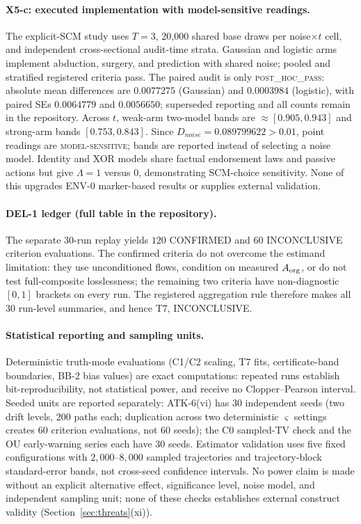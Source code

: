 \paragraph{X5-c: executed implementation with model-sensitive readings.}
The explicit-SCM study uses $T=3$, 20,000 shared base draws per noise$\times t$
cell, and independent cross-sectional audit-time strata. Gaussian and logistic
arms implement abduction, surgery, and prediction with shared noise; pooled and
stratified registered criteria pass. The paired audit is only
\textsc{post\_hoc\_pass}: absolute mean differences are $0.0077275$ (Gaussian)
and $0.0003984$ (logistic), with paired SEs $0.0064779$ and $0.0056650$;
superseded reporting and all counts remain in the repository.
Across $t$, weak-arm two-model bands are $\approx[0.905,0.943]$ and strong-arm
bands $[0.753,0.843]$. Since $D_{noise}=0.089799622>0.01$, point readings are
\textsc{model-sensitive}; bands are reported instead of selecting a noise model.
Identity and XOR models share factual endorsement laws and passive actions but
give $\Lambda=1$ versus $0$, demonstrating SCM-choice sensitivity. None of this
upgrades ENV-0 marker-based results or supplies external validation.

\paragraph{DEL-1 ledger (full table in the repository).}
The separate 30-run replay yields $120$ CONFIRMED and $60$ INCONCLUSIVE
criterion evaluations. The confirmed criteria do not overcome the estimand
limitation: they use unconditioned flows, condition on measured $A_{\mathrm{org}}$, or do
not test full-composite losslessness; the remaining two criteria have
non-diagnostic $[0,1]$ brackets on every run. The registered aggregation rule
therefore makes all 30 run-level summaries, and hence T7, INCONCLUSIVE.

\paragraph{Statistical reporting and sampling units.}
Deterministic truth-mode evaluations (C1/C2 scaling, T7 fits, certificate-band
boundaries, BB-2 bias values) are exact computations: repeated runs establish
bit-reproducibility, not statistical power, and receive no Clopper--Pearson
interval. Seeded units are reported separately: ATK-6(vi) has 30 independent
seeds (two drift levels, 200 paths each; duplication across two deterministic
$\varsigma$ settings creates 60 criterion evaluations, not 60 seeds); the C0
sampled-TV check and the OU early-warning series each have 30 seeds. Estimator
validation uses five fixed configurations with $2{,}000$--$8{,}000$ sampled
trajectories and trajectory-block standard-error bands, not cross-seed
confidence intervals. No power claim is made without an explicit alternative
effect, significance level, noise model, and independent sampling unit; none
of these checks establishes external construct validity
(Section~\ref{sec:threats}(xi)).

